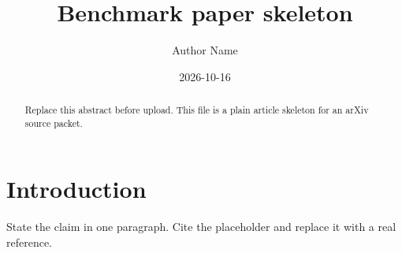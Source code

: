 \documentclass{article}
\title{Benchmark paper skeleton}
\author{Author Name}
\date{2026-10-16}
\begin{document}
\maketitle

\begin{abstract}
Replace this abstract before upload.
This file is a plain article skeleton for an arXiv source packet.
\end{abstract}

\section{Introduction}

State the claim in one paragraph.
Cite the placeholder \cite{example2026} and replace it with a real reference.



\end{document}
